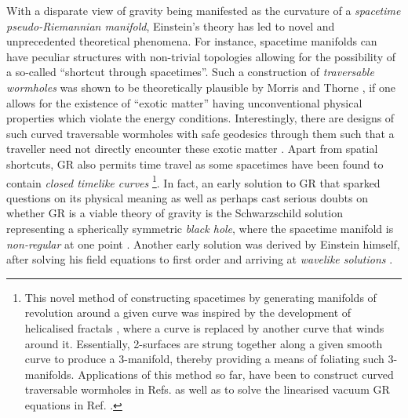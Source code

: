 \documentclass[aps,pre,preprint,superscriptaddress,showpacs,showkeys]{revtex4-1}
\begin{document}
With a disparate view of gravity being manifested as the curvature of a \emph{spacetime pseudo-Riemannian manifold}, Einstein's theory has led to novel and unprecedented theoretical phenomena. For instance, spacetime manifolds can have peculiar structures with non-trivial topologies allowing for the possibility of a so-called ``shortcut through spacetimes''. Such a construction of \emph{traversable wormholes} was shown to be theoretically plausible by Morris and Thorne \cite{Kip}, if one allows for the existence of ``exotic matter'' having unconventional physical properties which violate the energy conditions. Interestingly, there are designs of such curved traversable wormholes with safe geodesics through them such that a traveller need not directly encounter these exotic matter \cite{Vee2012,Vee2013}. Apart from spatial shortcuts, GR also permits time travel as some spacetimes have been found to contain \emph{closed timelike curves} \cite{CTC,Vee2015,VUW} \footnote{This novel method of constructing spacetimes by generating manifolds of revolution around a given curve was inspired by the development of helicalised fractals \cite{Vee2013b}, where a curve is replaced by another curve that winds around it. Essentially, 2-surfaces are strung together along a given smooth curve to produce a 3-manifold, thereby providing a means of foliating such 3-manifolds. Applications of this method so far, have been to construct curved traversable wormholes in Refs. \cite{Vee2012,Vee2013} as well as to solve the linearised vacuum GR equations in Ref. \cite{Vee2015}.}. In fact, an early solution to GR that sparked questions on its physical meaning as well as perhaps cast serious doubts on whether GR is a viable theory of gravity is the Schwarzschild solution representing a spherically symmetric \emph{black hole}, where the spacetime manifold is \emph{non-regular} at one point \cite{Gra}. Another early solution was derived by Einstein himself, after solving his field equations to first order and arriving at \emph{wavelike solutions} \cite{Einquad}.
\end{document}
